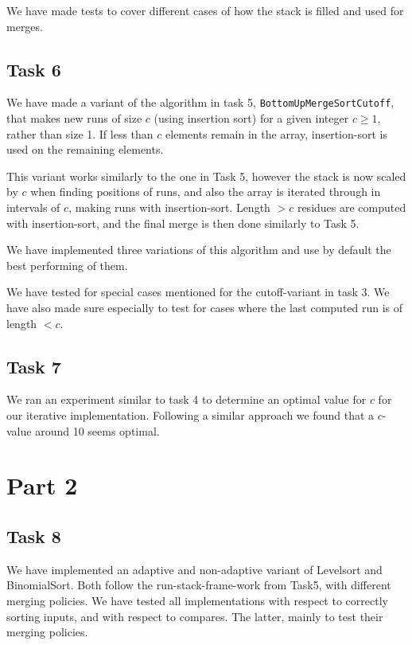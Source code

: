 \documentclass[11pt, a4paper]{article}
\begin{document}
 We have made tests to cover different cases of how the stack is filled and used for merges.

\subsection{Task 6}

We have made a variant of the algorithm in task 5, \verb|BottomUpMergeSortCutoff|, that makes new runs of size $c$ (using insertion sort) for a given integer $c\geq1$, rather than size 1. If less than $c$ elements remain in the array, insertion-sort is used on the remaining elements. 

This variant works similarly to the one in Task 5, however the stack is now scaled by $c$ when finding positions of runs, and also the array is iterated through in intervals of $c$, making runs with insertion-sort. Length $>c$ residues are computed with insertion-sort, and the final merge is then done similarly to Task 5.

We have implemented three variations of this algorithm and use by default the best performing of them. 

We have tested for special cases mentioned for the cutoff-variant in task 3. We have also made sure especially to test for cases where the last computed run is of length $<c$. 

\subsection{Task 7}

We ran an experiment similar to task 4 to determine an optimal value for $c$ for our iterative implementation. Following a similar approach we found that a $c$-value around 10 seems optimal.

\section{Part 2}

\subsection{Task 8}

We have implemented an adaptive and non-adaptive variant of Levelsort and BinomialSort. Both follow the run-stack-frame-work from Task5, with different merging policies. We have tested all implementations with respect to correctly sorting inputs, and with respect to compares. The latter, mainly to test their merging policies.
\end{document}
